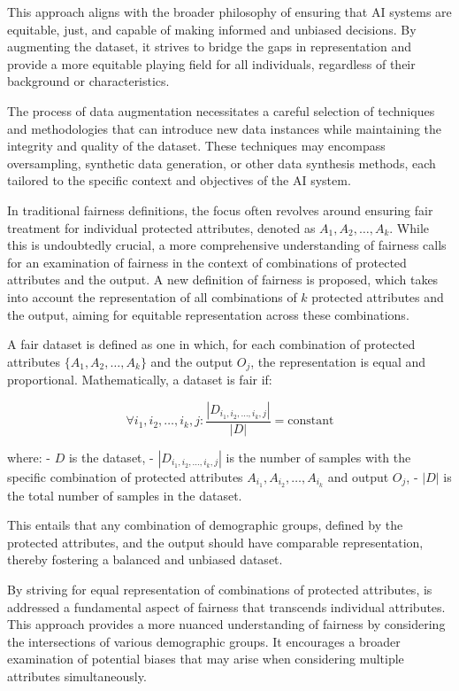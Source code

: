 \documentclass[12pt,a4paper,openright,twoside]{book}
\begin{document}
This approach aligns with the broader philosophy of ensuring that AI systems are equitable, just, and capable of making informed and unbiased decisions. By augmenting the dataset, it strives to bridge the gaps in representation and provide a more equitable playing field for all individuals, regardless of their background or characteristics. 

The process of data augmentation necessitates a careful selection of techniques and methodologies that can introduce new data instances while maintaining the integrity and quality of the dataset. These techniques may encompass oversampling, synthetic data generation, or other data synthesis methods, each tailored to the specific context and objectives of the AI system.

In traditional fairness definitions, the focus often revolves around ensuring fair treatment for individual protected attributes, denoted as $A_1, A_2, \ldots, A_k$. While this is undoubtedly crucial, a more comprehensive understanding of fairness calls for an examination of fairness in the context of combinations of protected attributes and the output. A new definition of fairness is proposed, which takes into account the representation of all combinations of $k$ protected attributes and the output, aiming for equitable representation across these combinations.

A fair dataset is defined as one in which, for each combination of protected attributes $\{A_1, A_2, \ldots, A_k\}$ and the output $O_j$, the representation is equal and proportional. Mathematically, a dataset is fair if:

\[
\forall i_1, i_2, \ldots, i_k, j: \frac{|D_{i_1, i_2, \ldots, i_k, j}|}{|D|} = \text{constant}
\]

where:
- $D$ is the dataset,
- $|D_{i_1, i_2, \ldots, i_k, j}|$ is the number of samples with the specific combination of protected attributes $A_{i_1}, A_{i_2}, \ldots, A_{i_k}$ and output $O_j$,
- $|D|$ is the total number of samples in the dataset.

This entails that any combination of demographic groups, defined by the protected attributes, and the output should have comparable representation, thereby fostering a balanced and unbiased dataset.

By striving for equal representation of combinations of protected attributes, is addressed a fundamental aspect of fairness that transcends individual attributes. This approach provides a more nuanced understanding of fairness by considering the intersections of various demographic groups. It encourages a broader examination of potential biases that may arise when considering multiple attributes simultaneously.
\end{document}
